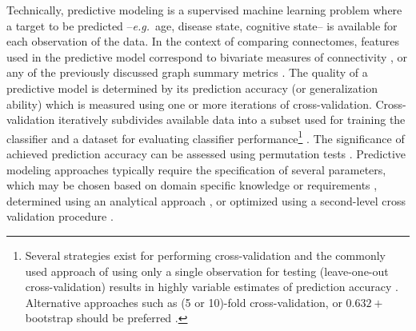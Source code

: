 \documentclass[5p]{elsarticle}
\begin{document}
Technically, predictive modeling is a supervised machine learning problem where
a target to be predicted --\emph{e.g.}\ age, disease state, cognitive state-- is
available for each observation of the data. In the context of comparing
connectomes, features used in the predictive model correspond to bivariate
measures of connectivity \cite{richiardi2011,dosenbach2010,shirer2012}, or any of the previously discussed graph
summary metrics \cite{cecchi2009,ekman2012}.
%
The quality of a predictive model is determined by its prediction accuracy (or
generalization ability) which is measured using one or more iterations of
cross-validation. Cross-validation iteratively subdivides available data into a
subset used for training the classifier and a dataset for evaluating classifier
performance\footnote{Several strategies exist for performing cross-validation and the commonly
used approach of using only a single observation for testing (leave-one-out
cross-validation) results in highly variable estimates of prediction accuracy
\cite{friedman2001}.
Alternative approaches such as (5 or 10)-fold cross-validation,
or $0.632+$ bootstrap should be preferred \cite{friedman2001}.} 
 \cite{pereira2009}.
The significance of
achieved prediction accuracy can be assessed using permutation tests
\cite{golland2003}.
Predictive modeling approaches typically require the specification of several
parameters, which may be chosen based on domain specific knowledge or
requirements \cite{cherkassky1998}, determined using an analytical approach
\cite{cherkassky2004}, or optimized using a second-level cross validation procedure
\cite{friedman2001}.  
\end{document}
